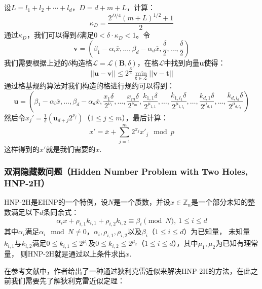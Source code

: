 \documentclass{book}
\numberwithin{equation}{subsubsection}
\begin{document}
设$L=l_1+l_2+\cdots+l_d$，$D=d+m+L$，计算：
\begin{equation}
    \kappa_{D}=\frac{2^{D/4}(m+L)^{1/2}+1}{2}
    \nonumber
\end{equation}
通过$\kappa_{D}$，我们可以得到$\delta$满足$0<\delta\cdot\kappa_{D}<1$。令
\begin{equation}
    \pmb{v}=(\beta_{1}-\alpha_{i}\overline{x},\ldots,\beta_{d}-\alpha_{d}\overline{x},\frac{\delta}{2},\ldots,\frac{\delta}{2})
    \nonumber
\end{equation}
我们需要根据上述的$\delta$构造格$\mathcal{L}=\mathcal{L}(\pmb{B},\delta)$，在格$\mathcal{L}$中找到向量$\pmb{u}$使得：
\begin{equation}
    ||\pmb{u}-\pmb{v}||\le 2^{\frac{D}{4}}\min_{\pmb{t}\in\mathcal{L}}||\pmb{v}-\pmb{t}||
    \nonumber
\end{equation}
通过格基规约算法对我们构造的格进行规约可以得到：
\begin{equation}
    \pmb{u}=\left(\beta_{1}-\alpha_{i}\overline{x},\ldots,\beta_{d}-\alpha_{d}\overline{x},\frac{x_1\delta}{2^{\nu_1}}
    ,\ldots,\frac{x_m\delta}{2^{\nu_m}},\frac{k_{1,1}\delta}{2^{\mu_{1,1}}},\ldots,\frac{k_{1,l_1}\delta}{2^{\mu_{1,l_{1}}}},\ldots,\frac{k_{d,1}\delta}{2^{\mu_{d,1}}},\ldots,\frac{k_{d,l_d}\delta}{2^{\mu_{d,l_d}}}\right)
    \nonumber
\end{equation}
然后令$x_{j}'=\frac{1}{\delta}(\pmb{u}_{d+j}2^{\nu_{j}})$（$1\le j\le m$），最后计算：
\begin{equation}
    x'=\overline{x}+\sum_{j=1}^{m}2^{\pi_j}x'_{j}\mod{p}
    \nonumber
\end{equation}
这样得到的$x'$就是我们需要的$x$.\par
\subsubsection*{双洞隐藏数问题（Hidden Number Problem with Two Holes, HNP-2H）}
HNP-2H是EHNP的一个特例，设$N$是一个质数，并设$x\in \mathbb{Z}_n$是一个部分未知的整数满足以下$d$条同余式：
\begin{equation}
    \alpha_ix+\rho_{i,1}k_{i,1}+\rho_{i,2}k_{i,2}\equiv \beta_i\pmod{N},\ 1\le i\le d
    \nonumber
\end{equation}
其中$\alpha_i$满足$\alpha_i\mod{N}\neq0$，$\alpha_i,\rho_{i,1},\rho_{i,2}$以及$\beta_i$（$1\le i\le d$）为已知量，
未知量$k_{i,1}$与$k_{i,2}$满足$0\le k_{i,1}\le2^{\mu_1}$及$0\le k_{i,2}\le2^{\mu_2}$（$1\le i\le d$），其中$\mu_1,\mu_2$为已知有理常量，
则HNP-2H就是通过以上条件求出$x$.\par
在参考文献\cite{19}中，作者给出了一种通过狄利克雷近似来解决HNP-2H的方法，在此之前我们需要先了解狄利克雷近似定理：
\end{document}
